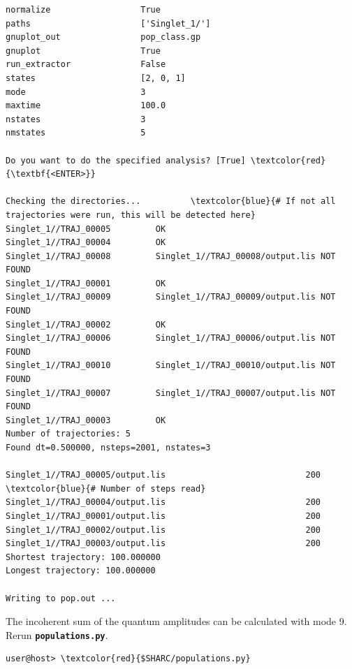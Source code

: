 \documentclass[a4paper,11pt,DIV=15,openany]{scrbook}
\newcommand{\ttt}[1]{\textbf{\texttt{#1}}}
\begin{document}
\begin{oframed}
\begin{Verbatim}[commandchars=\\\{\}]
normalize                  True
paths                      ['Singlet_1/']
gnuplot_out                pop_class.gp
gnuplot                    True
run_extractor              False
states                     [2, 0, 1]
mode                       3
maxtime                    100.0
nstates                    3
nmstates                   5

Do you want to do the specified analysis? [True] \textcolor{red}{\textbf{<ENTER>}}

Checking the directories...          \textcolor{blue}{# If not all trajectories were run, this will be detected here}
Singlet_1//TRAJ_00005         OK
Singlet_1//TRAJ_00004         OK
Singlet_1//TRAJ_00008         Singlet_1//TRAJ_00008/output.lis NOT FOUND
Singlet_1//TRAJ_00001         OK
Singlet_1//TRAJ_00009         Singlet_1//TRAJ_00009/output.lis NOT FOUND
Singlet_1//TRAJ_00002         OK
Singlet_1//TRAJ_00006         Singlet_1//TRAJ_00006/output.lis NOT FOUND
Singlet_1//TRAJ_00010         Singlet_1//TRAJ_00010/output.lis NOT FOUND
Singlet_1//TRAJ_00007         Singlet_1//TRAJ_00007/output.lis NOT FOUND
Singlet_1//TRAJ_00003         OK
Number of trajectories: 5
Found dt=0.500000, nsteps=2001, nstates=3

Singlet_1//TRAJ_00005/output.lis                            200          \textcolor{blue}{# Number of steps read}
Singlet_1//TRAJ_00004/output.lis                            200
Singlet_1//TRAJ_00001/output.lis                            200
Singlet_1//TRAJ_00002/output.lis                            200
Singlet_1//TRAJ_00003/output.lis                            200
Shortest trajectory: 100.000000
Longest trajectory: 100.000000

Writing to pop.out ...
\end{Verbatim}
\end{oframed}

\normalsize
The incoherent sum of the quantum amplitudes can be calculated with mode 9. Rerun \ttt{populations.py}.
\begin{Verbatim}[commandchars=\\\{\}]
user@host> \textcolor{red}{$SHARC/populations.py}
\end{Verbatim}
\end{document}
